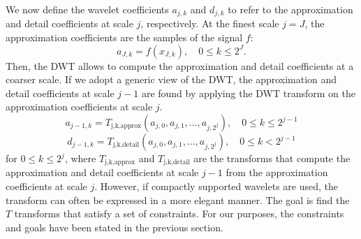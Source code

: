 We now define the wavelet coefficients \( a_{j,k} \) and \( d_{j,k} \) to refer to the approximation and detail coefficients at scale \( j \), respectively.
At the finest scale \( j = J \), the approximation coefficients are the samples of the signal \( f \):
\begin{equation}
\label{eq:approximation_coefficients_finest_scale}
a_{J,k}=f(x_{J,k}),\quad0\leq k\leq2^{J}.
\end{equation}
Then, the DWT allows to compute the approximation and detail coefficients at a coarser scale.
If we adopt a generic view of the DWT, the approximation and detail coefficients at scale \( j-1 \) are found by applying the DWT transform on the approximation coefficients at scale \( j \).
\begin{equation}
a_{j-1,k} = T_{\text{j,k,approx}}(a_{j,0}, a_{j,1}, \ldots, a_{j,2^{j}}),\quad 0 \leq k \leq 2^{j-1}
\end{equation}
\begin{equation}
d_{j-1,k} = T_{\text{j,k,detail}}(a_{j,0}, a_{j,1}, \ldots, a_{j,2^{j}}),\quad 0 \leq k < 2^{j-1}
\end{equation}
for \( 0 \leq k \leq 2^{j} \), where \( T_{\text{j,k,approx}} \) and \( T_{\text{j,k,detail}} \) are the transforms that compute the approximation and detail coefficients at scale \( j-1 \) from the approximation coefficients at scale \( j \).
However, if compactly supported wavelets are used, the transform can often be expressed in a more elegant manner.
The goal is find the $T$ transforms that satisfy a set of constraints.
For our purposes, the constraints and goals have been stated in the previous section.

